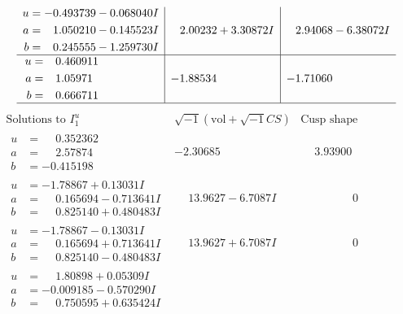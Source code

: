 \documentclass[1p]{elsarticle_modified}
\theoremstyle{definition}
\newcommand{\I}{\sqrt{-1}}
\begin{document}
$$\begin{array}{c|c|c}
\begin{aligned}
u &= -0.493739 - 0.068040 I \\
a &= \phantom{-}1.050210 - 0.145523 I \\
b &= \phantom{-}0.245555 - 1.259730 I\end{aligned}
 & \phantom{-}2.00232 + 3.30872 I & \phantom{-}2.94068 - 6.38072 I \\ \hline\begin{aligned}
u &= \phantom{-}0.460911\phantom{ +0.000000I} \\
a &= \phantom{-}1.05971\phantom{ +0.000000I} \\
b &= \phantom{-}0.666711\phantom{ +0.000000I}\end{aligned}
 & -1.88534\phantom{ +0.000000I} & -1.71060\phantom{ +0.000000I}\\
 \hline 
 \end{array}$$\newpage$$\begin{array}{c|c|c}  
\text{Solutions to }I^u_{1}& \I (\text{vol} + \sqrt{-1}CS) & \text{Cusp shape}\\
 \hline 
\begin{aligned}
u &= \phantom{-}0.352362\phantom{ +0.000000I} \\
a &= \phantom{-}2.57874\phantom{ +0.000000I} \\
b &= -0.415198\phantom{ +0.000000I}\end{aligned}
 & -2.30685\phantom{ +0.000000I} & \phantom{-}3.93900\phantom{ +0.000000I} \\ \hline\begin{aligned}
u &= -1.78867 + 0.13031 I \\
a &= \phantom{-}0.165694 - 0.713641 I \\
b &= \phantom{-}0.825140 + 0.480483 I\end{aligned}
 & \phantom{-}13.9627 - 6.7087 I & \phantom{-0.000000 } 0 \\ \hline\begin{aligned}
u &= -1.78867 - 0.13031 I \\
a &= \phantom{-}0.165694 + 0.713641 I \\
b &= \phantom{-}0.825140 - 0.480483 I\end{aligned}
 & \phantom{-}13.9627 + 6.7087 I & \phantom{-0.000000 } 0 \\ \hline\begin{aligned}
u &= \phantom{-}1.80898 + 0.05309 I \\
a &= -0.009185 - 0.570290 I \\
b &= \phantom{-}0.750595 + 0.635424 I\end{aligned}

\end{array}$$
\end{document}
